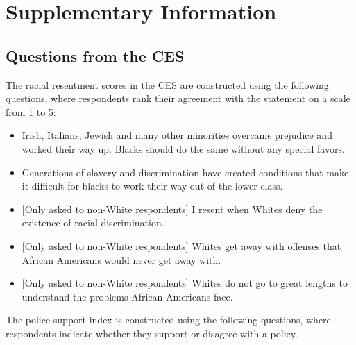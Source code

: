 \documentclass[
  12pt,
]{article}
\begin{document}
\begin{singlespace}

\end{singlespace}

\hypertarget{supplementary-information}{%
\section*{Supplementary Information}\label{supplementary-information}}

\hypertarget{questions-from-the-ces}{%
\subsection*{Questions from the CES}\label{questions-from-the-ces}}

The racial resentment scores in the CES are constructed using the following questions, where respondents rank their agreement with the statement on a scale from 1 to 5:

\begin{itemize}
\item
  Irish, Italians, Jewish and many other minorities overcame prejudice and worked their way up. Blacks should do the same without any special favors.
\item
  Generations of slavery and discrimination have created conditions that make it difficult for blacks to work their way out of the lower class.
\item
  {[}Only asked to non-White respondents{]} I resent when Whites deny the existence of racial discrimination.
\item
  {[}Only asked to non-White respondents{]} Whites get away with offenses that African Americans would never get away with.
\item
  {[}Only asked to non-White respondents{]} Whites do not go to great lengths to understand the problems African Americans face.
\end{itemize}

The police support index is constructed using the following questions, where respondents indicate whether they support or disagree with a policy.
\end{document}
